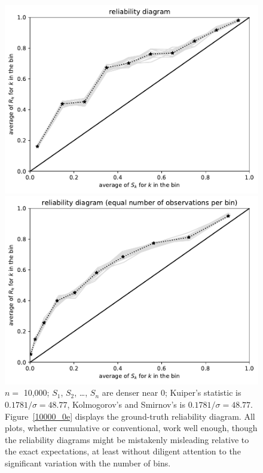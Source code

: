 \documentclass{article}
\begin{document}
\begin{figure}
\begin{centering}
\parbox{\imsize}{\includegraphics[width=\imsize]
                {./codes/unweighted/10000_10_1_2/equiprob.pdf}}
\quad\quad
\parbox{\imsize}{\includegraphics[width=\imsize]
                {./codes/unweighted/10000_10_1_2/equisamp.pdf}}

\end{centering}
\caption{$n =$ 10,000; $S_1$, $S_2$, \dots, $S_n$ are denser near 0;
         Kuiper's statistic is $0.1781 / \sigma = 48.77$,
         Kolmogorov's and Smirnov's is $0.1781 / \sigma = 48.77$.
Figure~\ref{10000_0e} displays the ground-truth reliability diagram.
All plots, whether cumulative or conventional, work well enough,
though the reliability diagrams
might be mistakenly misleading relative to the exact expectations,
at least without diligent attention to the significant variation
with the number of bins.
}
\label{10000_0}
\end{figure}
\end{document}
